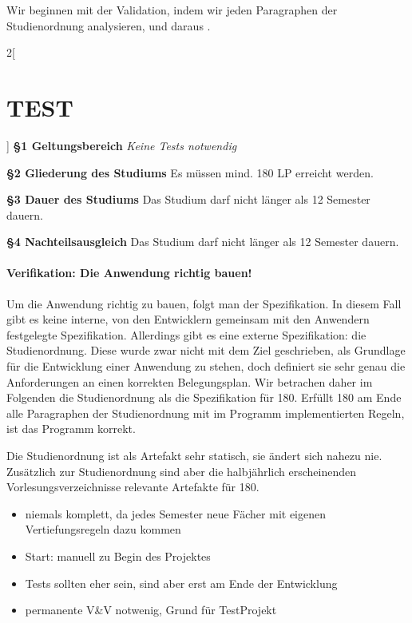 \documentclass[ngerman]{article}
\begin{document}
Wir beginnen mit der Validation, indem wir jeden Paragraphen der Studienordnung analysieren, und daraus \todo{}.

\setlength{\parindent}{0cm}

\begin{paracol}{2}[\section{TEST}]
\textbf{§1 Geltungsbereich}
\switchcolumn
\emph{Keine Tests notwendig}
\\
\switchcolumn*

\textbf{§2 Gliederung des Studiums}
\switchcolumn
Es müssen mind. 180 LP erreicht werden.
\\
\switchcolumn*

\textbf{§3 Dauer des Studiums}
\switchcolumn
Das Studium darf nicht länger als 12 Semester dauern.
\switchcolumn*

\textbf{§4 Nachteilsausgleich}
\switchcolumn
Das Studium darf nicht länger als 12 Semester dauern.
\switchcolumn*

\end{paracol}

\paragraph{Verifikation: Die Anwendung richtig bauen!}

Um die Anwendung richtig zu bauen, folgt man der Spezifikation.
In diesem Fall gibt es keine interne, von den Entwicklern gemeinsam mit den Anwendern festgelegte Spezifikation.
Allerdings gibt es eine externe Spezifikation: die Studienordnung.
Diese wurde zwar nicht mit dem Ziel geschrieben, als Grundlage für die Entwicklung einer Anwendung zu stehen, doch definiert sie sehr genau die Anforderungen an einen korrekten Belegungsplan.
Wir betrachen daher im Folgenden die Studienordnung als die Spezifikation für 180.
Erfüllt 180 am Ende alle Paragraphen der Studienordnung mit im Programm implementierten Regeln, ist das Programm korrekt.

Die Studienordnung ist als Artefakt sehr statisch, sie ändert sich nahezu nie.
Zusätzlich zur Studienordnung sind aber die halbjährlich erscheinenden Vorlesungsverzeichnisse relevante Artefakte für 180.

\begin{itemize}
    \item
        niemals komplett, da jedes Semester neue Fächer mit eigenen Vertiefungsregeln dazu kommen 
    \item
        Start: manuell zu Begin des Projektes
    \item
        Tests sollten eher sein, sind aber erst am Ende der Entwicklung
    \item
        permanente V\&V notwenig, Grund für TestProjekt
\end{itemize}
\end{document}

